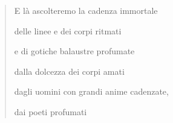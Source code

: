 \documentclass[
	a0,
	portrait
	]{a0poster}
\begin{document}
\begin{multicols}{4}
\begin{quotation}
\begin{it}
\begin{flushright}
E là ascolteremo la cadenza immortale

delle linee e dei corpi ritmati

e di gotiche balaustre profumate

dalla dolcezza dei corpi amati

dagli uomini con grandi anime cadenzate,

dai poeti profumati
\end{flushright}
\end{it}
\end{quotation}

\vfill

~

\end{multicols}
\end{document}
